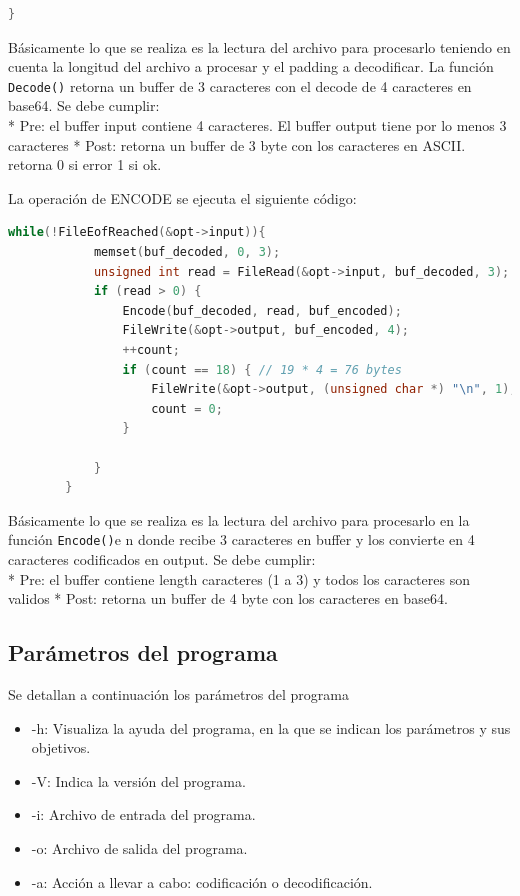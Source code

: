\documentclass[10pt,a4paper]{article}
\begin{document}
\begin{itemize}
\begin{lstlisting}[language=C]
        }
	\end{lstlisting}
	Básicamente lo que se realiza es la lectura del archivo para procesarlo teniendo en cuenta la longitud del archivo a procesar y el padding a decodificar. La función \texttt{Decode()} retorna un buffer de 3 caracteres con el decode de 4 caracteres en base64. Se debe cumplir:\\

 * Pre: el buffer input contiene 4 caracteres. El buffer output tiene por lo menos 3 caracteres
 * Post: retorna un buffer de 3 byte con los caracteres en ASCII. retorna 0 si error 1 si ok.


La operación de ENCODE se ejecuta el siguiente código:
\begin{lstlisting}[language=C]
        while(!FileEofReached(&opt->input)){
            memset(buf_decoded, 0, 3);
            unsigned int read = FileRead(&opt->input, buf_decoded, 3);
            if (read > 0) {
                Encode(buf_decoded, read, buf_encoded);
                FileWrite(&opt->output, buf_encoded, 4);
                ++count;
                if (count == 18) { // 19 * 4 = 76 bytes
                    FileWrite(&opt->output, (unsigned char *) "\n", 1);
                    count = 0;
                }

            }
        }
\end{lstlisting}
Básicamente lo que se realiza es la lectura del archivo para procesarlo en la función \texttt{Encode()}e n donde recibe 3 caracteres en buffer y los convierte en 4 caracteres codificados en output. Se debe cumplir:\\

 * Pre: el buffer contiene length caracteres (1 a 3) y todos los caracteres son validos
 * Post: retorna un buffer de 4 byte con los caracteres en base64.


	\end{itemize}


\subsection{Parámetros del programa}

Se detallan a continuación los parámetros del programa

\begin{itemize}
    \item -h: Visualiza la ayuda del programa, en la que se indican los parámetros y sus objetivos.
    \item -V: Indica la versión del programa.
    \item -i: Archivo de entrada del programa.
    \item -o: Archivo de salida del programa.
    \item -a: Acción a llevar a cabo: codificación o decodificación.
\end{itemize}
\end{document}
